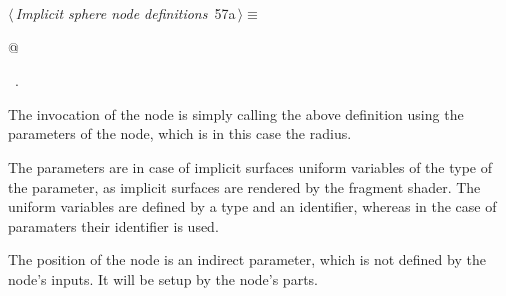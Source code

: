 \documentclass[
    a4paper,      %
    10pt,         %
    openright,    %
    notitlepage,  %
    parskip=half, %
]{scrreprt}       %
\theoremstyle{definition}                    %
\begin{document}
\begin{flushleft} \small
\begin{minipage}{\linewidth}\label{scrap93}\raggedright\small
{} $\langle\,${\itshape Implicit sphere node definitions}\nobreak\ {\footnotesize {57a}}$\,\rangle\equiv$
\vspace{-1exm}
\begin{list}{}{} \item
\mbox{}@{\NWsep}
\end{list}
\vspace{-1.5ex}
\footnotesize
\begin{list}{}{\setlength{\itemsep}{-\parsep}\setlength{\itemindent}{-\leftmargin}}
\item \NWtxtMacroRefIn\ .

\item{}
\end{list}
\end{minipage}\vspace{4ex}
\end{flushleft}
The invocation of the node is simply calling the above definition using the
parameters of the node, which is in this case the radius.

The parameters are in case of implicit surfaces uniform variables of the type
of the parameter, as implicit surfaces are rendered by the fragment shader. The
uniform variables are defined by a type and an identifier, whereas in the case
of paramaters their identifier is used.

The position of the node is an indirect parameter, which is not defined by the
node's inputs. It will be setup by the node's parts.
\end{document}
